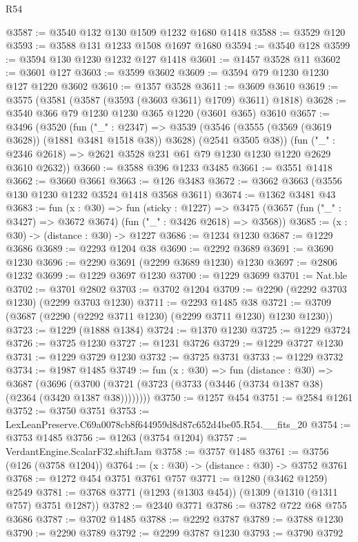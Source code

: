 \begin{lexlean}{R54}
\begin{coremodule}
@3587 := @3540 @132 @130 @1509 @1232 @1680 @1418
@3588 := @3529 @120
@3593 := @3588 @131 @1233 @1508 @1697 @1680
@3594 := @3540 @128
@3599 := @3594 @130 @1230 @1232 @127 @1418
@3601 := @1457 @3528 @11
@3602 := @3601 @127
@3603 := @3599 @3602
@3609 := @3594 @79 @1230 @1230 @127 @1220 @3602
@3610 := @1357 @3528
@3611 := @3609 @3610
@3619 := @3575 (@3581 (@3587 (@3593 (@3603 @3611) @1709) @3611) @1818)
@3628 := @3540 @366 @79 @1230 @1230 @365 @1220 (@3601 @365) @3610
@3657 := @3496
    (@3520
      (fun ("_" : @2347) =>
      @3539 (@3546 (@3555 (@3569 (@3619 @3628)) (@1881 @3481 @1518 @38)) @3628) (@2541 @3505 @38))
      (fun ("_" : @2346 @2618) => @2621 @3528 @231 @61 @79 @1230 @1230 @1220 @2629 @3610 @2632))
@3660 := @3588 @396 @1233 @3485
@3661 := @3551 @1418
@3662 := @3660 @3661
@3663 := @126 @3483
@3672 := @3662 @3663 (@3556 @130 @1230 @1232 @3524 @1418 @3568 @3611)
@3674 := @1362 @3481 @43
@3683 := fun (x : @30) =>
  fun (sticky : @1227) =>
  @3475 (@3657 (fun ("_" : @3427) => @3672 @3674) (fun ("_" : @3426 @2618) => @3568))
@3685 := (x : @30) -> (distance : @30) -> @1227
@3686 := @1234 @1230
@3687 := @1229 @3686
@3689 := @2293 @1204 @38
@3690 := @2292 @3689
@3691 := @3690 @1230
@3696 := @2290 @3691 (@2299 @3689 @1230) @1230
@3697 := @2806 @1232
@3699 := @1229 @3697 @1230
@3700 := @1229 @3699
@3701 := Nat.ble
@3702 := @3701 @2802
@3703 := @3702 @1204
@3709 := @2290 (@2292 @3703 @1230) (@2299 @3703 @1230)
@3711 := @2293 @1485 @38
@3721 := @3709 (@3687 (@2290 (@2292 @3711 @1230) (@2299 @3711 @1230) @1230 @1230))
@3723 := @1229 (@1888 @1384)
@3724 := @1370 @1230
@3725 := @1229 @3724
@3726 := @3725 @1230
@3727 := @1231 @3726
@3729 := @1229 @3727 @1230
@3731 := @1229 @3729 @1230
@3732 := @3725 @3731
@3733 := @1229 @3732
@3734 := @1987 @1485
@3749 := fun (x : @30) =>
  fun (distance : @30) =>
  @3687 (@3696 (@3700 (@3721 (@3723 (@3733 (@3446 (@3734 @1387 @38) (@2364 (@3420 @1387 @38))))))))
@3750 := @1257 @454
@3751 := @2584 @1261
@3752 := @3750 @3751
@3753 := LexLeanPreserve.C69a0078cb8f644959d8d87c652d4be05.R54.__fits_20
@3754 := @3753 @1485
@3756 := @1263 (@3754 @1204)
@3757 := VerdantEngine.ScalarF32.shiftJam
@3758 := @3757 @1485
@3761 := @3756 (@126 (@3758 @1204))
@3764 := (x : @30) -> (distance : @30) -> @3752 @3761
@3768 := @1272 @454 @3751 @3761 @757
@3771 := @1280 (@3462 @1259) @2549
@3781 := @3768 @3771 (@1293 (@1303 @454)) (@1309 (@1310 (@1311 @757) @3751 @1287))
@3782 := @2340 @3771
@3786 := @3782 @722 @68 @755 @3686
@3787 := @3702 @1485
@3788 := @2292 @3787
@3789 := @3788 @1230
@3790 := @2290 @3789
@3792 := @2299 @3787 @1230
@3793 := @3790 @3792

\end{coremodule}
\end{lexlean}
